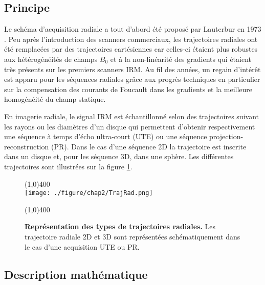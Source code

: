 \subsection{Principe}
Le schéma d'acquisition radiale a tout d'abord été proposé par Lauterbur en 1973 \cite{lauterbur1973image}. Peu après l'introduction des scanners commerciaux, les trajectoires radiales ont été remplacées par des trajectoires cartésiennes car celles-ci étaient plus robustes aux hétérogénéités de champs $B_0$ et à la non-linéarité des gradients qui étaient très présents sur les premiers scanners IRM. Au fil des années, un regain d'intérêt est apparu pour les séquences radiales grâce aux progrès techniques en particulier sur la compensation des courants de Foucault dans les gradients et la meilleure homogénéité du champ statique. 

En imagerie radiale, le signal IRM est échantillonné selon des trajectoires suivant les rayons ou les diamètres d'un disque qui permettent d'obtenir respectivement une séquence à temps d'écho ultra-court (UTE) ou une séquence projection-reconstruction (PR). Dans le cas d'une séquence 2D la trajectoire est inscrite dans un disque et, pour les séquence 3D, dans une sphère. Les différentes trajectoires sont illustrées sur la figure \ref{fig:TrajRad}.

\begin{figure}[H]
\centering
\line(1,0){400} \\
\texttt{[image: ./figure/chap2/TrajRad.png]}
\caption[Représentation des types de trajectoires radiales.]{\label{fig:TrajRad} \textbf{Représentation des types de trajectoires radiales.} Les trajectoire radiale 2D et 3D sont représentées schématiquement dans le cas d'une acquisition UTE ou PR.}
\line(1,0){400} \\
\end{figure}




\subsection{Description mathématique}

